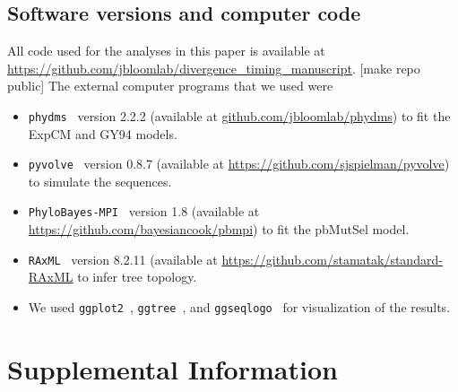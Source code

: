 \documentclass[11pt]{article}
\newcommand\skhcomment[1]{{\color{cyan}[#1]}}
\begin{document}
\subsection*{Software versions and computer code}
All code used for the analyses in this paper is available at \url{https://github.com/jbloomlab/divergence_timing_manuscript}. \skhcomment{make repo public}
The external computer programs that we used were
\begin{itemize} 
\item \texttt{phydms}~\citep{hilton2017phydms} version 2.2.2 (available at \url{github.com/jbloomlab/phydms}) to fit the ExpCM and GY94 models.
\item \texttt{pyvolve}~\citep{spielman2015pyvolve} version 0.8.7 (available at \url{https://github.com/sjspielman/pyvolve}) to simulate the sequences.
\item \texttt{PhyloBayes-MPI}~\citep{rodrigue2014site} version 1.8 (available at \url{https://github.com/bayesiancook/pbmpi}) to fit the pbMutSel model. 
\item \texttt{RAxML}~\citep{stamatakis2006raxml} version 8.2.11 (available at \url{https://github.com/stamatak/standard-RAxML} to infer tree topology.
\item We used \texttt{ggplot2}~\citep{wickham2016ggplot2}, \texttt{ggtree}~\citep{yu2017ggtree}, and \texttt{ggseqlogo}~\citep{wagih2017ggseqlogo} for visualization of the results.
\end{itemize}

\clearpage 



\newpage
\section*{Supplemental Information}
\end{document}
